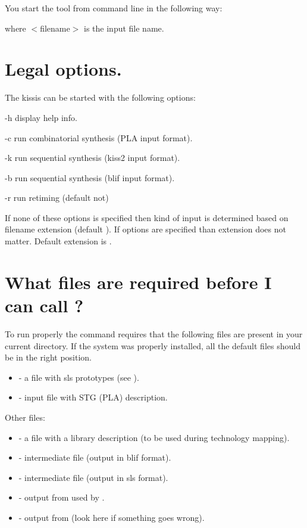 You start the tool from command line in the following way:


where $<$filename$>$ is the input file name.


\section{Legal options.}

The kissis can be started with the following options:

\nopagebreak
-h display help info.

-c run combinatorial synthesis (PLA input format).

-k run sequential synthesis (kiss2 input format).

-b run sequential synthesis (blif input format).

-r run retiming (default not)



If none of these options is specified then kind of input 
is determined based on filename extension (default ).  
If  options are specified than extension does not
matter. Default extension is .

\section{What files are required before I can call \protect{}?}

To run properly the command requires that the following
files are present in your current directory. If the  system was
properly installed, all the default files should be in the right position.

\begin{itemize}
\item {}  - a file with sls prototypes (see \protect{}).
\item {} - input file with STG (PLA)  
                   description.

\end{itemize}
Other files:

\begin{itemize}
\item {} - a file with a
library description (to be used during technology mapping).
\item {} -  intermediate file (output in blif format).

\item {} - intermediate file (output in sls format).

\item {} - output from \protect{} used by 
                  \protect{}.

\item {} - output from \protect{} (look here if
something goes wrong). 

\end{itemize}

